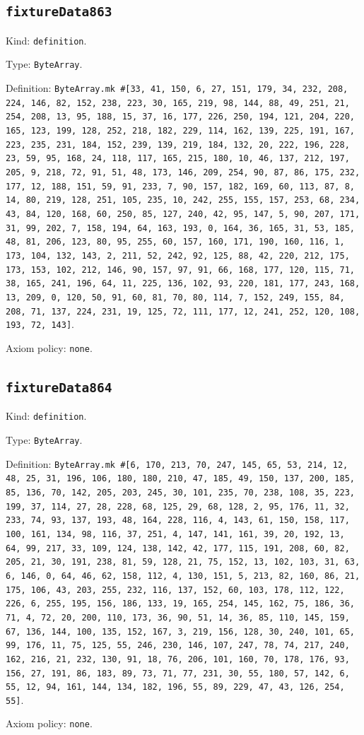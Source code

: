 \documentclass[11pt]{article}
\begin{document}
\subsection*{\texttt{fixtureData863}}
\noindent Kind: \texttt{definition}.\par
\noindent Type: \texttt{ByteArray}.\par
\noindent Definition: \texttt{ByteArray.mk \#[33, 41, 150, 6, 27, 151, 179, 34, 232, 208, 224, 146, 82, 152, 238, 223, 30, 165, 219, 98, 144, 88, 49, 251, 21, 254, 208, 13, 95, 188, 15, 37, 16, 177, 226, 250, 194, 121, 204, 220, 165, 123, 199, 128, 252, 218, 182, 229, 114, 162, 139, 225, 191, 167, 223, 235, 231, 184, 152, 239, 139, 219, 184, 132, 20, 222, 196, 228, 23, 59, 95, 168, 24, 118, 117, 165, 215, 180, 10, 46, 137, 212, 197, 205, 9, 218, 72, 91, 51, 48, 173, 146, 209, 254, 90, 87, 86, 175, 232, 177, 12, 188, 151, 59, 91, 233, 7, 90, 157, 182, 169, 60, 113, 87, 8, 14, 80, 219, 128, 251, 105, 235, 10, 242, 255, 155, 157, 253, 68, 234, 43, 84, 120, 168, 60, 250, 85, 127, 240, 42, 95, 147, 5, 90, 207, 171, 31, 99, 202, 7, 158, 194, 64, 163, 193, 0, 164, 36, 165, 31, 53, 185, 48, 81, 206, 123, 80, 95, 255, 60, 157, 160, 171, 190, 160, 116, 1, 173, 104, 132, 143, 2, 211, 52, 242, 92, 125, 88, 42, 220, 212, 175, 173, 153, 102, 212, 146, 90, 157, 97, 91, 66, 168, 177, 120, 115, 71, 38, 165, 241, 196, 64, 11, 225, 136, 102, 93, 220, 181, 177, 243, 168, 13, 209, 0, 120, 50, 91, 60, 81, 70, 80, 114, 7, 152, 249, 155, 84, 208, 71, 137, 224, 231, 19, 125, 72, 111, 177, 12, 241, 252, 120, 108, 193, 72, 143]}.\par
\noindent Axiom policy: \texttt{none}.\par
\subsection*{\texttt{fixtureData864}}
\noindent Kind: \texttt{definition}.\par
\noindent Type: \texttt{ByteArray}.\par
\noindent Definition: \texttt{ByteArray.mk \#[6, 170, 213, 70, 247, 145, 65, 53, 214, 12, 48, 25, 31, 196, 106, 180, 180, 210, 47, 185, 49, 150, 137, 200, 185, 85, 136, 70, 142, 205, 203, 245, 30, 101, 235, 70, 238, 108, 35, 223, 199, 37, 114, 27, 28, 228, 68, 125, 29, 68, 128, 2, 95, 176, 11, 32, 233, 74, 93, 137, 193, 48, 164, 228, 116, 4, 143, 61, 150, 158, 117, 100, 161, 134, 98, 116, 37, 251, 4, 147, 141, 161, 39, 20, 192, 13, 64, 99, 217, 33, 109, 124, 138, 142, 42, 177, 115, 191, 208, 60, 82, 205, 21, 30, 191, 238, 81, 59, 128, 21, 75, 152, 13, 102, 103, 31, 63, 6, 146, 0, 64, 46, 62, 158, 112, 4, 130, 151, 5, 213, 82, 160, 86, 21, 175, 106, 43, 203, 255, 232, 116, 137, 152, 60, 103, 178, 112, 122, 226, 6, 255, 195, 156, 186, 133, 19, 165, 254, 145, 162, 75, 186, 36, 71, 4, 72, 20, 200, 110, 173, 36, 90, 51, 14, 36, 85, 110, 145, 159, 67, 136, 144, 100, 135, 152, 167, 3, 219, 156, 128, 30, 240, 101, 65, 99, 176, 11, 75, 125, 55, 246, 230, 146, 107, 247, 78, 74, 217, 240, 162, 216, 21, 232, 130, 91, 18, 76, 206, 101, 160, 70, 178, 176, 93, 156, 27, 191, 86, 183, 89, 73, 71, 77, 231, 30, 55, 180, 57, 142, 6, 55, 12, 94, 161, 144, 134, 182, 196, 55, 89, 229, 47, 43, 126, 254, 55]}.\par
\noindent Axiom policy: \texttt{none}.\par
\end{document}
